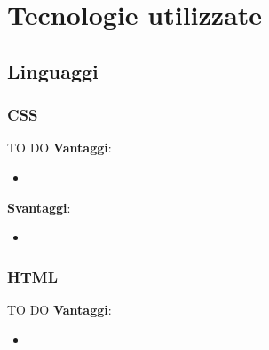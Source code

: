 %
%


\section{Tecnologie utilizzate} %
\label{sec:tecnologie_utilizzate}

	\subsection{Linguaggi} %
	\label{sub:linguaggi}

		\subsubsection{CSS} %
		\label{ssub:css}
		TO DO \newline
		\textbf{Vantaggi}:
			\begin{itemize}
				\item 
			\end{itemize}
			\noindent
		
		\textbf{Svantaggi}:
			\begin{itemize}
				\item 
			\end{itemize}
			\noindent

		\subsubsection{HTML} %
		\label{ssub:html}
		TO DO \newline
		\textbf{Vantaggi}:
			\begin{itemize}
				\item 
			\end{itemize}
			\noindent
		
